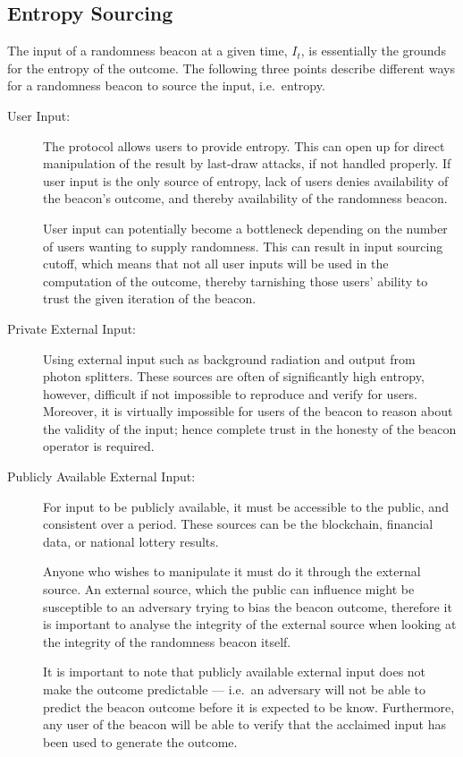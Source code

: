 \subsection{Entropy Sourcing}
The input of a randomness beacon at a given time, $I_t$, is essentially the grounds for the entropy of the outcome.
The following three points describe different ways for a randomness beacon to source the input, i.e.\ entropy.
\begin{description}
    \item[User Input:]
        The protocol allows users to provide entropy.
        This can open up for direct manipulation of the result by last-draw attacks, if not handled properly.
        If user input is the only source of entropy, lack of users denies availability of the beacon's outcome, and thereby availability of the randomness beacon.

        User input can potentially become a bottleneck depending on the number of users wanting to supply randomness.
        This can result in input sourcing cutoff, which means that not all user inputs will be used in the computation of the outcome, thereby tarnishing those users' ability to trust the given iteration of the beacon.

    \item[Private External Input:]
        Using external input such as background radiation and output from photon splitters.
        These sources are often of significantly high entropy, however, difficult if not impossible to reproduce and verify for users.
        Moreover, it is virtually impossible for users of the beacon to reason about the validity of the input; hence complete trust in the honesty of the beacon operator is required.

    \item[Publicly Available External Input:]
        For input to be publicly available, it must be accessible to the public, and consistent over a period.
        These sources can be the blockchain, financial data, or national lottery results.

        Anyone who wishes to manipulate it must do it through the external source.
        An external source, which the public can influence might be susceptible to an adversary trying to bias the beacon outcome, therefore it is important to analyse the integrity of the external source when looking at the integrity of the randomness beacon itself.

        It is important to note that publicly available external input does not make the outcome predictable --- i.e.\ an adversary will not be able to predict the beacon outcome before it is expected to be know.
        Furthermore, any user of the beacon will be able to verify that the acclaimed input has been used to generate the outcome.

\end{description}

